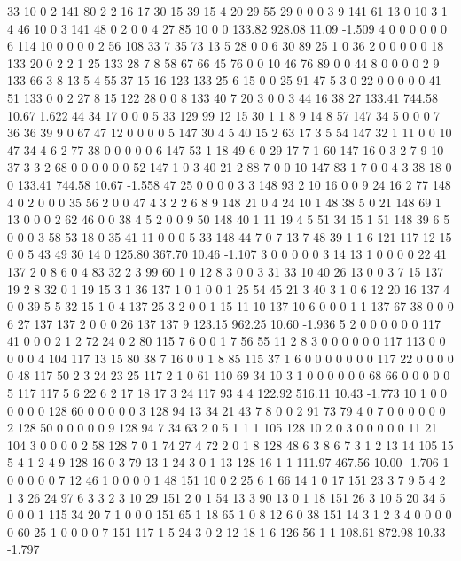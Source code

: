  33 10 0 2 141 80 2 2 16 17 30 15 39 15 4 20 29 55 29 0
 0 0 3 9 141 61 13 0 10 3 1 4 46 10 0 3 141 48 0 2
 0 0 4 27 85 10 0 0
133.82 928.08 11.09 -1.509
 4 0 0 0 0 0 0 6 114 10 0 0 0 0 2 56 108 33 7 35
 73 13 5 28 0 0 6 30 89 25 1 0 36 2 0 0 0 0 0 18
 133 20 0 2 2 1 25 133 28 7 8 58 67 66 45 76 0 0 10 46
 76 89 0 0 44 8 0 0 0 0 2 9 133 66 3 8 13 5 4 55
 37 15 16 123 133 25 6 15 0 0 25 91 47 5 3 0 22 0 0 0
 0 0 41 51 133 0 0 2 27 8 15 122 28 0 0 8 133 40 7 20
 3 0 0 3 44 16 38 27
133.41 744.58 10.67 1.622
 44 34 17 0 0 0 5 33 129 99 12 15 30 1 1 8 9 14 8 57
 147 34 5 0 0 0 7 36 36 39 9 0 67 47 12 0 0 0 0 5
 147 30 4 5 40 15 2 63 17 3 5 54 147 32 1 11 0 0 10 47
 34 4 6 2 77 38 0 0 0 0 0 6 147 53 1 18 49 6 0 29
 17 7 1 60 147 16 0 3 2 7 9 10 37 3 3 2 68 0 0 0
 0 0 0 52 147 1 0 3 40 21 2 88 7 0 0 10 147 83 1 7
 0 0 4 3 38 18 0 0
133.41 744.58 10.67 -1.558
 47 25 0 0 0 0 3 3 148 93 2 10 16 0 0 9 24 16 2 77
 148 4 0 2 0 0 0 35 56 2 0 0 47 4 3 2 2 6 8 9
 148 21 0 4 24 10 1 48 38 5 0 21 148 69 1 13 0 0 0 2
 62 46 0 0 38 4 5 2 0 0 9 50 148 40 1 11 19 4 5 51
 34 15 1 51 148 39 6 5 0 0 0 3 58 53 18 0 35 41 11 0
 0 0 5 33 148 44 7 0 7 13 7 48 39 1 1 6 121 117 12 15
 0 0 5 43 49 30 14 0
125.80 367.70 10.46 -1.107
 3 0 0 0 0 0 3 14 13 1 0 0 0 0 22 41 137 2 0 8
 6 0 4 83 32 2 3 99 60 1 0 12 8 3 0 0 3 31 33 10
 40 26 13 0 0 3 7 15 137 19 2 8 32 0 1 19 15 3 1 36
 137 1 0 1 0 0 1 25 54 45 21 3 40 3 1 0 6 12 20 16
 137 4 0 0 39 5 5 32 15 1 0 4 137 25 3 2 0 0 1 15
 11 10 137 10 6 0 0 0 1 1 137 67 38 0 0 0 6 27 137 137
 2 0 0 0 26 137 137 9
123.15 962.25 10.60 -1.936
 5 2 0 0 0 0 0 0 117 41 0 0 0 2 1 2 72 24 0 2
 80 115 7 6 0 0 1 7 56 55 11 2 8 3 0 0 0 0 0 0
 117 113 0 0 0 0 0 4 104 117 13 15 80 38 7 16 0 0 1 8
 85 115 37 1 6 0 0 0 0 0 0 0 117 22 0 0 0 0 0 48
 117 50 2 3 24 23 25 117 2 1 0 61 110 69 34 10 3 1 0 0
 0 0 0 0 68 66 0 0 0 0 0 5 117 117 5 6 22 6 2 17
 18 17 3 24 117 93 4 4
122.92 516.11 10.43 -1.773
 10 1 0 0 0 0 0 0 128 60 0 0 0 0 0 3 128 94 13 34
 21 43 7 8 0 0 2 91 73 79 4 0 7 0 0 0 0 0 0 2
 128 50 0 0 0 0 0 9 128 94 7 34 63 2 0 5 1 1 1 105
 128 10 2 0 3 0 0 0 0 0 11 21 104 3 0 0 0 0 2 58
 128 7 0 1 74 27 4 72 2 0 1 8 128 48 6 3 8 6 7 3
 1 2 13 14 105 15 5 4 1 2 4 9 128 16 0 3 79 13 1 24
 3 0 1 13 128 16 1 1
111.97 467.56 10.00 -1.706
 1 0 0 0 0 0 7 12 46 1 0 0 0 0 1 48 151 10 0 2
 25 6 1 66 14 1 0 17 151 23 3 7 9 5 4 2 1 3 26 24
 97 6 3 3 2 3 10 29 151 2 0 1 54 13 3 90 13 0 1 18
 151 26 3 10 5 20 34 5 0 0 0 1 115 34 20 7 1 0 0 0
 151 65 1 18 65 1 0 8 12 6 0 38 151 14 3 1 2 3 4 0
 0 0 0 0 60 25 1 0 0 0 0 7 151 117 1 5 24 3 0 2
 12 18 1 6 126 56 1 1
108.61 872.98 10.33 -1.797

